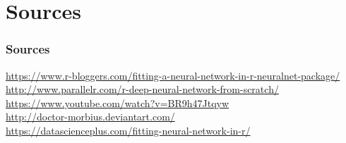 \documentclass[compress]{beamer}
\begin{document}
			
			

\section*{Sources}
\begin{frame}
\frametitle{Sources}
	\url{https://www.r-bloggers.com/fitting-a-neural-network-in-r-neuralnet-package/}\\
	\url{http://www.parallelr.com/r-deep-neural-network-from-scratch/}\\
	\url{https://www.youtube.com/watch?v=BR9h47Jtqyw}\\
	\url{http://doctor-morbius.deviantart.com/}\\
	\url{https://datascienceplus.com/fitting-neural-network-in-r/}%
\end{frame}
\end{document}
